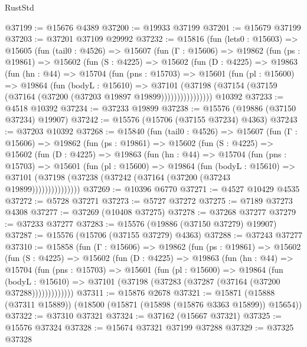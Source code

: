 \begin{lexlean}{RustStd}
\begin{coremodule}
@37199 := @15676 @4389
@37200 := @19933 @37199
@37201 := @15679 @37199
@37203 := @37201 @37109 @29992
@37232 := @15816
    (fun (lets0 : @15603) =>
    @15605
      (fun (tail0 : @4526) =>
      @15607
        (fun (Γ : @15606) =>
        @19862
          (fun (ps : @19861) =>
          @15602
            (fun (S : @4225) =>
            @15602
              (fun (D : @4225) =>
              @19863
                (fun (hn : @44) =>
                @15704
                  (fun (pns : @15703) =>
                  @15601
                    (fun (pl : @15600) =>
                    @19864
                      (fun (bodyL : @15610) =>
                      @37101
                        (@37198
                          (@37154 (@37159 (@37164 (@37200 (@37203 @19897 @19899))))))))))))))))
    @10392
@37233 := @4518 @10392
@37234 := @37233 @19899
@37238 := @15576 (@19886 (@37150 @37234) @19907)
@37242 := @15576 (@15706 (@37155 @37234) @4363)
@37243 := @37203 @10392
@37268 := @15840
    (fun (tail0 : @4526) =>
    @15607
      (fun (Γ : @15606) =>
      @19862
        (fun (ps : @19861) =>
        @15602
          (fun (S : @4225) =>
          @15602
            (fun (D : @4225) =>
            @19863
              (fun (hn : @44) =>
              @15704
                (fun (pns : @15703) =>
                @15601
                  (fun (pl : @15600) =>
                  @19864
                    (fun (bodyL : @15610) =>
                    @37101 (@37198 (@37238 (@37242 (@37164 (@37200 (@37243 @19899)))))))))))))))
@37269 := @10396 @6770
@37271 := @4527 @10429 @4535
@37272 := @5728 @37271
@37273 := @5727 @37272
@37275 := @7189 @37273 @4308
@37277 := @37269 (@10408 @37275)
@37278 := @37268 @37277
@37279 := @37233 @37277
@37283 := @15576 (@19886 (@37150 @37279) @19907)
@37287 := @15576 (@15706 (@37155 @37279) @4363)
@37288 := @37243 @37277
@37310 := @15858
    (fun (Γ : @15606) =>
    @19862
      (fun (ps : @19861) =>
      @15602
        (fun (S : @4225) =>
        @15602
          (fun (D : @4225) =>
          @19863
            (fun (hn : @44) =>
            @15704
              (fun (pns : @15703) =>
              @15601
                (fun (pl : @15600) =>
                @19864
                  (fun (bodyL : @15610) =>
                  @37101 (@37198 (@37283 (@37287 (@37164 (@37200 @37288)))))))))))))
@37311 := @15876 @2678
@37321 := @15871 (@15888 (@37311 @15889)) (@18500 (@15871 (@15898 (@15876 @3363 @15899)) @15654))
@37322 := @37310 @37321
@37324 := @37162 (@15667 @37321)
@37325 := @15576 @37324
@37328 := @15674 @37321 @37199 @37288
@37329 := @37325 @37328

\end{coremodule}
\end{lexlean}
